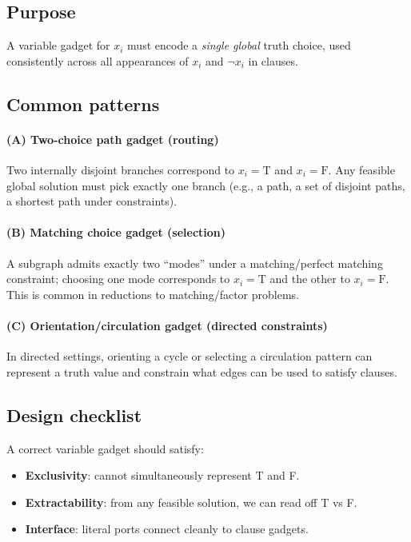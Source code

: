 \documentclass[11pt]{article}
\begin{document}
\subsection{Purpose}
A variable gadget for $x_i$ must encode a \emph{single global} truth choice, used consistently across all appearances of $x_i$ and $\neg x_i$ in clauses.

\subsection{Common patterns}
\paragraph{(A) Two-choice path gadget (routing)}
Two internally disjoint branches correspond to $x_i=\text{T}$ and $x_i=\text{F}$. Any feasible global solution must pick exactly one branch (e.g., a path, a set of disjoint paths, a shortest path under constraints).

\paragraph{(B) Matching choice gadget (selection)}
A subgraph admits exactly two ``modes'' under a matching/perfect matching constraint; choosing one mode corresponds to $x_i=\text{T}$ and the other to $x_i=\text{F}$. This is common in reductions to matching/factor problems.

\paragraph{(C) Orientation/circulation gadget (directed constraints)}
In directed settings, orienting a cycle or selecting a circulation pattern can represent a truth value and constrain what edges can be used to satisfy clauses.

\subsection{Design checklist}
A correct variable gadget should satisfy:
\begin{itemize}[itemsep=2pt]
  \item \textbf{Exclusivity}: cannot simultaneously represent T and F.
  \item \textbf{Extractability}: from any feasible solution, we can read off T vs F.
  \item \textbf{Interface}: literal ports connect cleanly to clause gadgets.
\end{itemize}
\end{document}
